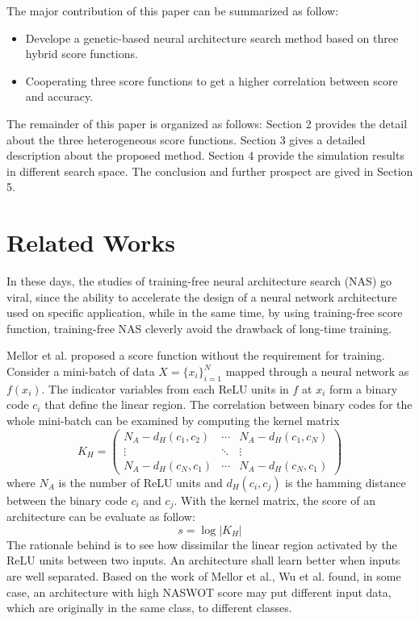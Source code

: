\documentclass[sigconf]{acmart}
\begin{document}
    The major contribution of this paper can be summarized as follow:
    \begin{itemize}
        \item Develope a genetic-based neural architecture search method based on three hybrid score functions.
        \item Cooperating three score functions to get a higher correlation between score and accuracy.
    \end{itemize}

    The remainder of this paper is organized as follows: Section 2 provides the 
    detail about the three heterogeneous score functions. Section 3 gives a detailed 
    description about the proposed method. Section 4 provide the simulation results 
    in different search space. The conclusion and further prospect are gived in 
    Section 5.

    \section{Related Works}
    In these days, the studies of training-free neural architecture search (NAS) 
    go viral, since the ability to accelerate the design of a neural network 
    architecture used on specific application, while in the same time, by using 
    training-free score function, training-free NAS cleverly avoid the drawback 
    of long-time training. 

    Mellor et al. \cite{https://doi.org/10.48550/arxiv.2006.04647} proposed a 
    score function without the requirement for training. 
    Consider a mini-batch of data $X=\{x_i\}^N_{i=1}$ mapped through a neural 
    network as $f(x_i)$. The indicator variables from each ReLU units in $f$ 
    at $x_i$ form a binary code $c_i$ that define the linear region.
    The correlation between binary codes for the whole mini-batch can be examined 
    by computing the kernel matrix
    \begin{equation}
        K_H=\begin{pmatrix}N_A-d_H(c_1,c_2)&\cdots&N_A-d_H(c_1,c_N)\\\vdots&\ddots&\vdots\\N_A-d_H(c_N,c_1)&\cdots&N_A-d_H(c_N,c_1)\end{pmatrix}
    \end{equation}
    where $N_A$ is the number of ReLU units and $d_H(c_i,c_j)$ is the hamming 
    distance between the binary code $c_i$ and $c_j$.
    With the kernel matrix, the score of an architecture can be evaluate as 
    follow:
    \begin{equation}
        s=\log\lvert K_H\rvert
    \end{equation}
    The rationale behind is to see how dissimilar the linear region activated by 
    the ReLU units between two inputs. An architecture shall learn better 
    when inputs are well separated.
    Based on the work of Mellor et al., Wu et al. \cite{10.1145/3491396.3506510} 
    found, in some case, an architecture with high NASWOT score may put different 
    input data, which are originally in the same class, to different classes. 
    
\end{document}

